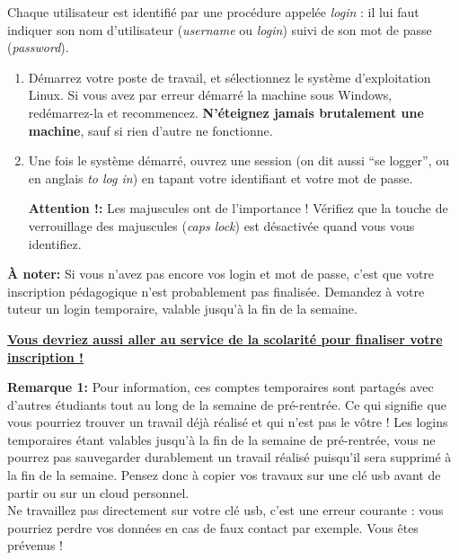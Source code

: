 \documentclass{article}
\begin{document}
\begin{exercice}

Chaque utilisateur est identifié par une procédure appelée \emph{login} : il lui
faut indiquer son nom d'utilisateur (\emph{username} ou \emph{login}) suivi de son mot de passe (\emph{password}).

\begin{enumerate}
\item Démarrez votre poste de travail, et sélectionnez le système d'exploitation
    Linux. Si vous avez par erreur démarré la machine sous Windows,  
    redémarrez-la et recommencez. \textbf{N'éteignez jamais brutalement une
    machine}, sauf si rien d'autre ne fonctionne.

\item Une fois le système démarré, ouvrez une session (on dit aussi ``se logger'', ou en anglais \emph{to log in}) en tapant votre identifiant et votre mot de passe.
    
\medskip
    \textbf{Attention !: }Les majuscules ont de l'importance ! Vérifiez que la touche
    de verrouillage des majuscules (\emph{caps lock}) est désactivée quand vous vous
    identifiez.
\end{enumerate}

\textbf{À noter: }Si vous n'avez pas encore vos login et mot de passe, c'est que votre inscription
pédagogique n'est probablement pas finalisée. Demandez à votre tuteur un login temporaire, valable jusqu'à la fin de la semaine.

\begin{center}
\underline{\textbf{Vous devriez aussi aller au service de la scolarité pour finaliser votre inscription !}}
\end{center}

\medskip

\textbf{Remarque 1: }Pour information, ces comptes temporaires sont partagés avec d'autres étudiants tout au long de
la semaine de pré-rentrée. Ce qui signifie que vous pourriez trouver un travail déjà réalisé et qui n'est pas le vôtre !
Les logins temporaires étant valables jusqu'à la fin de la semaine de pré-rentrée, vous ne pourrez pas sauvegarder durablement un travail réalisé puisqu'il sera supprimé à la fin de la semaine.
Pensez donc à copier vos travaux sur une clé usb avant de partir ou sur un cloud personnel.\\
Ne travaillez pas directement sur votre clé usb, c'est une erreur courante : vous pourriez perdre vos données en cas de faux contact par exemple. Vous êtes prévenus !\\


\end{exercice}
\end{document}
